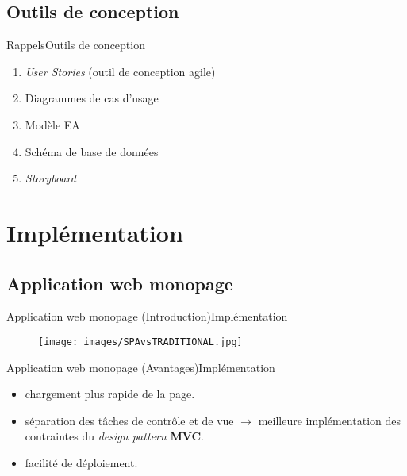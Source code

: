 \documentclass[usenames,dvipsnames]{beamer}
\begin{document}
\subsection{Outils de conception}
\begin{frame}{Rappels}{Outils de conception}
  \begin{enumerate}
    \item \textit{User Stories} (outil de conception agile)
    \item Diagrammes de cas d'usage
    \item Modèle EA
    \item Schéma de base de données
    \item \textit{Storyboard}
  \end{enumerate}
\end{frame}
\section{Implémentation}
\subsection{Application web monopage}
\begin{frame}{Application web monopage (Introduction)}{Implémentation}
  \begin{figure}[!ht]
    \texttt{[image: images/SPAvsTRADITIONAL.jpg]}
  \end{figure}
\end{frame}

\begin{frame}{Application web monopage (Avantages)}{Implémentation}
  \begin{itemize}
    \item chargement plus rapide de la page.
    \item séparation des tâches de contrôle et de vue $\rightarrow$ meilleure implémentation des contraintes du \textit{design pattern} \textbf{MVC}.
    \item facilité de déploiement.
  \end{itemize}
\end{frame}
\end{document}
